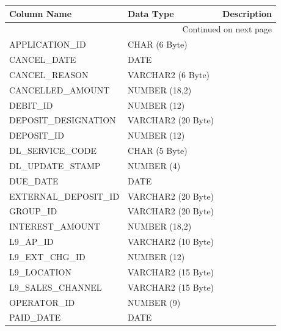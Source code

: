\documentclass[12pt,twoside]{article}
\begin{document}
\scriptsize
\begin{longtable}{lll}

\hline
 \textbf{Column Name}   &  \textbf{Data Type}  &  \textbf{Description} \\
\hline
\endhead
\hline\multicolumn{3}{r}{Continued on next page}\
\endfoot
\endlastfoot
 ACCOUNT\_ID            &  NUMBER (12)         &                        \\
 APPLICATION\_ID        &  CHAR (6 Byte)       &                        \\
 CANCEL\_DATE           &  DATE                &                        \\
 CANCEL\_REASON         &  VARCHAR2 (6 Byte)   &                        \\
 CANCELLED\_AMOUNT      &  NUMBER (18,2)       &                        \\
 DEBIT\_ID              &  NUMBER (12)         &                        \\
 DEPOSIT\_DESIGNATION   &  VARCHAR2 (20 Byte)  &                        \\
 DEPOSIT\_ID            &  NUMBER (12)         &                        \\
 DL\_SERVICE\_CODE      &  CHAR (5 Byte)       &                        \\
 DL\_UPDATE\_STAMP      &  NUMBER (4)          &                        \\
 DUE\_DATE              &  DATE                &                        \\
 EXTERNAL\_DEPOSIT\_ID  &  VARCHAR2 (20 Byte)  &                        \\
 GROUP\_ID              &  VARCHAR2 (20 Byte)  &                        \\
 INTEREST\_AMOUNT       &  NUMBER (18,2)       &                        \\
 L9\_AP\_ID             &  VARCHAR2 (10 Byte)  &                        \\
 L9\_EXT\_CHG\_ID       &  NUMBER (12)         &                        \\
 L9\_LOCATION           &  VARCHAR2 (15 Byte)  &                        \\
 L9\_SALES\_CHANNEL     &  VARCHAR2 (15 Byte)  &                        \\
 OPERATOR\_ID           &  NUMBER (9)          &                        \\
 PAID\_DATE             &  DATE                &                        \\

\end{longtable}
\end{document}

